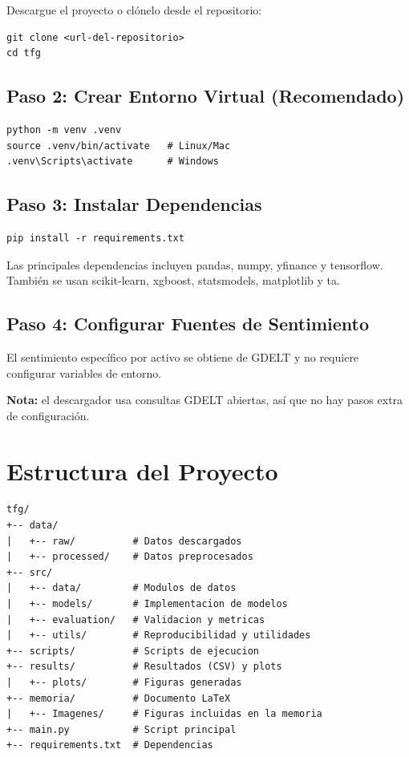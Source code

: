 Descargue el proyecto o clónelo desde el repositorio:

\begin{verbatim}
git clone <url-del-repositorio>
cd tfg
\end{verbatim}

\subsection{Paso 2: Crear Entorno Virtual (Recomendado)}

\begin{verbatim}
python -m venv .venv
source .venv/bin/activate   # Linux/Mac
.venv\Scripts\activate      # Windows
\end{verbatim}

\subsection{Paso 3: Instalar Dependencias}

\begin{verbatim}
pip install -r requirements.txt
\end{verbatim}

Las principales dependencias incluyen pandas, numpy, yfinance y tensorflow. También se usan scikit-learn, xgboost, statsmodels, matplotlib y ta.

\subsection{Paso 4: Configurar Fuentes de Sentimiento}

El sentimiento específico por activo se obtiene de GDELT y no requiere configurar variables de entorno.

\textbf{Nota:} el descargador usa consultas GDELT abiertas, así que no hay pasos extra de configuración.

\section{Estructura del Proyecto}

\begin{verbatim}
tfg/
+-- data/
|   +-- raw/          # Datos descargados
|   +-- processed/    # Datos preprocesados
+-- src/
|   +-- data/         # Modulos de datos
|   +-- models/       # Implementacion de modelos
|   +-- evaluation/   # Validacion y metricas
|   +-- utils/        # Reproducibilidad y utilidades
+-- scripts/          # Scripts de ejecucion
+-- results/          # Resultados (CSV) y plots
|   +-- plots/        # Figuras generadas
+-- memoria/          # Documento LaTeX
|   +-- Imagenes/     # Figuras incluidas en la memoria
+-- main.py           # Script principal
+-- requirements.txt  # Dependencias
\end{verbatim}


